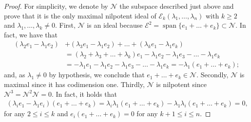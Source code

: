 \documentclass[10pt,a4paper]{amsart}
\DeclareMathOperator{\spa}{span}
\begin{document}
\begin{proof}
	For simplicity, we denote by $\mathcal{N}$ the subspace described just above and prove that it is the only maximal nilpotent ideal of  $\mathcal{E}_k(\lambda_1,\dots,\lambda_n)$ with $k\geq2$ and $\lambda_1,\dots,\lambda_k\neq0$. First, $\mathcal{N}$ is an ideal because $\mathcal{E}^2=\spa\{e_1+\dots+e_k\}\subset\mathcal{N}$. In fact, we have that
	\begin{align*}
		(\lambda_2e_1-\lambda_1e_2)&+(\lambda_3e_1-\lambda_1e_2)+\dots+(\lambda_ke_1-\lambda_1e_k)\\&
		=(\lambda_2+\lambda_3+\dots+\lambda_k)e_1-\lambda _1e_2-\lambda_1e_3-\dots-\lambda_1e_k\\&
		=-\lambda_1e_1-\lambda _1e_2-\lambda_1e_3-\dots-\lambda_1e_k
		=-\lambda_1(e_1+\dots+e_k);
	\end{align*}
	and, as $\lambda_1\neq0$ by hypothesis, we conclude that $e_1+\dots+e_k\in\mathcal{N}$. Secondly, $\mathcal{N}$ is maximal since it has codimension one. Thirdly, $\mathcal{N}$ is nilpotent since $\mathcal{N}^3=\mathcal{N}^2\mathcal{N}=0$. In fact, it holds that
	\begin{align}\label{eq:para_siguiente_th}
		(\lambda_ie_1-\lambda_1e_i)(e_1+\dots+e_k)=\lambda_i\lambda_1(e_1+\dots+e_k)-\lambda_1\lambda_i(e_1+\dots+e_k)=0,
	\end{align}
for any $2\leq i\leq k$ and $e_i(e_1+\dots+e_k)=0$ for any $k+1\leq i\leq n$. 


\end{proof}
\end{document}
